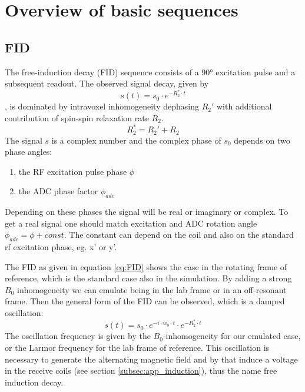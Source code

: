 \documentclass[a4paper,12pt]{extarticle}
\begin{document}
\newpage
\section{Overview of basic sequences}
\vspace{7.5cm}

\subsection{FID}
The free-induction decay (FID) sequence consists of a 90° excitation pulse and a subsequent readout. The observed signal decay, given by
\begin{equation}
\label{eq:FID}
s(t)=s_0\cdot e^{-R_2^*\cdot t}
\end{equation}
, is dominated by intravoxel inhomogeneity dephasing $R_2'$ with additional contribution of spin-spin relaxation rate $R_2$.
\begin{equation}
R_2^*=R_2'+R_2
\end{equation}The signal $s$ is a complex number and the complex phase of $s_0$ depends on two phase angles:
\begin{enumerate}
\item the RF excitation pulse phase $\phi$
\item the ADC phase factor $\phi_{adc}$
\end{enumerate}
Depending on these phases the signal will be real or imaginary or complex. To get a real signal one should match excitation and ADC rotation angle $\phi_{adc}=\phi+const.$ The constant can depend on the coil and also on the standard rf excitation phase, eg. x' or y'.

The FID as given in equation \eqref{eq:FID} shows the case in the rotating frame of reference, which is the standard case also in the simulation. By adding a strong $B_0$ inhomogeneity we can emulate being in the lab frame or in an off-resonant frame. Then the general form of the FID can be observed, which is a damped oscillation:
\begin{equation}
\label{eq:FIDlab}
s(t)=s_0\cdot e^{-i\cdot w_0\cdot t}\cdot e^{-R_2^*\cdot t}
\end{equation}The oscillation frequency is given by the $B_0$-inhomogeneity for our emulated case, or the Larmor frequency for the lab frame of reference. This oscillation is necessary to generate the alternating magnetic field and by that induce a voltage in the receive coils (see section \ref{subsec:app_induction}), thus the name free induction decay.
\end{document}
